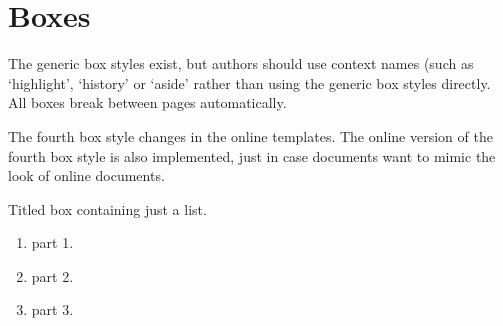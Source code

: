 \documentclass[solutionsatend,twocolumnsolutions]{ouunit}
\begin{document}
\section{Boxes}
The generic box styles exist, but authors should use context names (such as `highlight', `history' or `aside' rather than using the generic box styles directly. All boxes break between pages automatically.
\begin{style1box}
\lipsum[1]
\end{style1box}
\begin{style2box}
\lipsum[2]
\end{style2box}
\begin{style3box}
\lipsum[3]
\end{style3box}
\begin{style3box}
\lipsum[3]
\end{style3box}
\begin{style4box}
\lipsum[4]
\end{style4box}
The fourth box style changes in the online templates. The online version of the fourth box style is also implemented, just in case documents want to mimic the look of online documents.
\begin{onlinestyle4box}
\lipsum[4]
\end{onlinestyle4box}
Titled box containing just a list.
\begin{style4box}[Solution]
\begin{enumerate}
\item part 1.
\item part 2.
\item part 3.
\end{enumerate}
\end{style4box}
\end{document}
